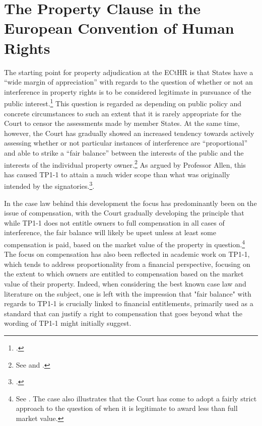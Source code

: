 \section{The Property Clause in the European Convention of Human Rights}

The starting point for property adjudication at the ECtHR is that States have a ``wide margin of appreciation'' with regards to the question of whether or not an interference in property rights is to be considered legitimate in pursuance of the public interest.\footcite[See][54]{james86} This question is regarded as depending on public policy and concrete circumstances to such an extent that it is rarely appropriate for the Court to censor the assessments made by member States. At the same time, however, the Court has gradually showed an increased tendency towards actively assessing whether or not particular instances of interference are ``proportional'' and able to strike a ``fair balance'' between the interests of the public and the interests of the individual property owner.\footnote{See \cite[69]{sporrong82} and \cite[120]{james86}.}  As argued by Professor Allen, this has caused TP1-1 to attain a much wider scope than what was originally intended by the signatories.\footcite[1055]{allen10}.

In the case law behind this development the focus has predominantly been on the issue of compensation, with the Court gradually developing the principle that while TP1-1 does not entitle owners to full compensation in all cases of interference, the fair balance will likely be upset unless at least some compensation is paid, based on the market value of the property in question.\footnote{See \cite[103]{scordino06}. The case also illustrates that the Court has come to adopt a fairly strict approach to the question of when it is legitimate to award less than full market value.} The focus on compensation has also been reflected in academic work on TP1-1, which tends to address proportionality from a financial perspective, focusing on the extent to which owners are entitled to compensation based on the market value of their property. Indeed, when considering the best known case law and literature on the subject, one is left with the impression that "fair balance" with regards to TP1-1 is crucially linked to financial entitlements, primarily used as a standard that can justify a right to compensation that goes beyond what the wording of TP1-1 might initially suggest.

